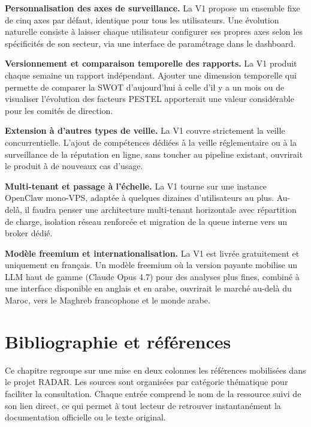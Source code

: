 \documentclass[12pt,a4paper,openany]{report}
\begin{document}
\textbf{Personnalisation des axes de surveillance.} La V1 propose un ensemble fixe de cinq axes par défaut, identique pour tous les utilisateurs. Une évolution naturelle consiste à laisser chaque utilisateur configurer ses propres axes selon les spécificités de son secteur, via une interface de paramétrage dans le dashboard.

\textbf{Versionnement et comparaison temporelle des rapports.} La V1 produit chaque semaine un rapport indépendant. Ajouter une dimension temporelle qui permette de comparer la SWOT d'aujourd'hui à celle d'il y a un mois ou de visualiser l'évolution des facteurs PESTEL apporterait une valeur considérable pour les comités de direction.

\textbf{Extension à d'autres types de veille.} La V1 couvre strictement la veille concurrentielle. L'ajout de compétences dédiées à la veille réglementaire ou à la surveillance de la réputation en ligne, sans toucher au pipeline existant, ouvrirait le produit à de nouveaux cas d'usage.

\textbf{Multi-tenant et passage à l'échelle.} La V1 tourne sur une instance OpenClaw mono-VPS, adaptée à quelques dizaines d'utilisateurs au plus. Au-delà, il faudra penser une architecture multi-tenant horizontale avec répartition de charge, isolation réseau renforcée et migration de la queue interne vers un broker dédié.

\textbf{Modèle freemium et internationalisation.} La V1 est livrée gratuitement et uniquement en français. Un modèle freemium où la version payante mobilise un LLM haut de gamme (Claude Opus 4.7) pour des analyses plus fines, combiné à une interface disponible en anglais et en arabe, ouvrirait le marché au-delà du Maroc, vers le Maghreb francophone et le monde arabe.

\chapter{Bibliographie et références}
\label{chap:bibliographie}

Ce chapitre regroupe sur une mise en deux colonnes les références mobilisées dans le projet RADAR. Les sources sont organisées par catégorie thématique pour faciliter la consultation. Chaque entrée comprend le nom de la ressource suivi de son lien direct, ce qui permet à tout lecteur de retrouver instantanément la documentation officielle ou le texte original.
\end{document}
